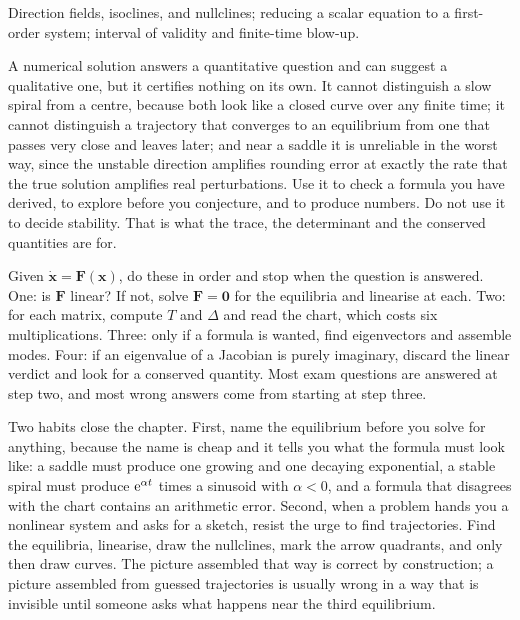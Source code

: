 \begin{seealsob}Direction fields, isoclines, and nullclines; reducing a scalar equation to a first-order system; interval of validity and finite-time blow-up.\end{seealsob}

A numerical solution answers a quantitative question and can suggest a qualitative one, but it certifies nothing on its own. It cannot distinguish a slow spiral from a centre, because both look like a closed curve over any finite time; it cannot distinguish a trajectory that converges to an equilibrium from one that passes very close and leaves later; and near a saddle it is unreliable in the worst way, since the unstable direction amplifies rounding error at exactly the rate that the true solution amplifies real perturbations. Use it to check a formula you have derived, to explore before you conjecture, and to produce numbers. Do not use it to decide stability. That is what the trace, the determinant and the conserved quantities are for.

\begin{keynote}
Given $\dot{\mathbf{x}}=\mathbf{F}(\mathbf{x})$, do these in order and stop when the question is answered. One: is $\mathbf{F}$ linear? If not, solve $\mathbf{F}=\mathbf{0}$ for the equilibria and linearise at each. Two: for each matrix, compute $T$ and $\Delta$ and read the chart, which costs six multiplications. Three: only if a formula is wanted, find eigenvectors and assemble modes. Four: if an eigenvalue of a Jacobian is purely imaginary, discard the linear verdict and look for a conserved quantity. Most exam questions are answered at step two, and most wrong answers come from starting at step three.
\end{keynote}

Two habits close the chapter. First, name the equilibrium before you solve for anything, because the name is cheap and it tells you what the formula must look like: a saddle must produce one growing and one decaying exponential, a stable spiral must produce $\mathrm{e}^{\alpha t}$ times a sinusoid with $\alpha<0$, and a formula that disagrees with the chart contains an arithmetic error. Second, when a problem hands you a nonlinear system and asks for a sketch, resist the urge to find trajectories. Find the equilibria, linearise, draw the nullclines, mark the arrow quadrants, and only then draw curves. The picture assembled that way is correct by construction; a picture assembled from guessed trajectories is usually wrong in a way that is invisible until someone asks what happens near the third equilibrium.

